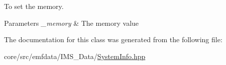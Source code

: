 To set the memory. 


\begin{DoxyParams}{Parameters}
{\em \_\-memory} & The memory value \\
\hline
\end{DoxyParams}


The documentation for this class was generated from the following file:\begin{DoxyCompactItemize}
\item 
core/src/emfdata/IMS\_\-Data/\hyperlink{SystemInfo_8hpp}{SystemInfo.hpp}\end{DoxyCompactItemize}
